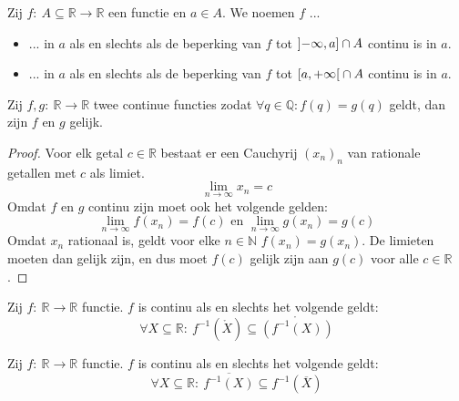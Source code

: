 \documentclass[main.tex]{subfiles}
\begin{document}
\begin{de}
  Zij $f:\ A \subseteq \mathbb{R} \rightarrow \mathbb{R}$ een functie en $a\in A$.
  We noemen $f$ ...
  \begin{itemize}
  \item ... in $a$ als en slechts als de beperking van $f$ tot $\interval[open left]{-\infty}{a} \cap A$ continu is in $a$.
  \item ... in $a$ als en slechts als de beperking van $f$ tot $\interval[open right]{a}{+\infty} \cap A$ continu is in $a$.
  \end{itemize}
\end{de}

\begin{st}
  Zij $f,g:\ \mathbb{R} \rightarrow \mathbb{R}$ twee continue functies zodat $\forall q\in \mathbb{Q}: f(q) = g(q)$ geldt, dan zijn $f$ en $g$ gelijk.

  \begin{proof}
    Voor elk getal $c \in \mathbb{R}$ bestaat er een Cauchyrij $(x_{n})_{n}$ van rationale getallen met $c$ als limiet.\waarom
    \[ \lim_{n\rightarrow \infty}x_{n} = c\]
    Omdat $f$ en $g$ continu zijn moet ook het volgende gelden:
    \[ \lim_{n\rightarrow \infty}f(x_{n}) = f(c) \text{ en } \lim_{n\rightarrow \infty}g(x_{n}) = g(c) \]
    Omdat $x_{n}$ rationaal is, geldt voor elke $n\in \mathbb{N}$ $f(x_{n})=g(x_{n})$.
    De limieten moeten dan gelijk zijn\waarom, en dus moet $f(c)$ gelijk zijn aan $g(c)$ voor alle $c\in \mathbb{R}$.
  \end{proof}
\end{st}

\begin{st}
  Zij $f:\ \mathbb{R} \rightarrow \mathbb{R}$ functie.
  $f$ is continu als en slechts het volgende geldt:
  \[ \forall X \subseteq \mathbb{R}:\ f^{-1}(\mathring{X}) \subseteq \mathring{\left(f^{-1}(X)\right)} \]
\end{st}

\begin{st}
  Zij $f:\ \mathbb{R} \rightarrow \mathbb{R}$ functie.
  $f$ is continu als en slechts het volgende geldt:
  \[ \forall X \subseteq \mathbb{R}:\ \overline{f^{-1}(X)} \subseteq f^{-1}(\overline{X}) \]
\end{st}
\end{document}
